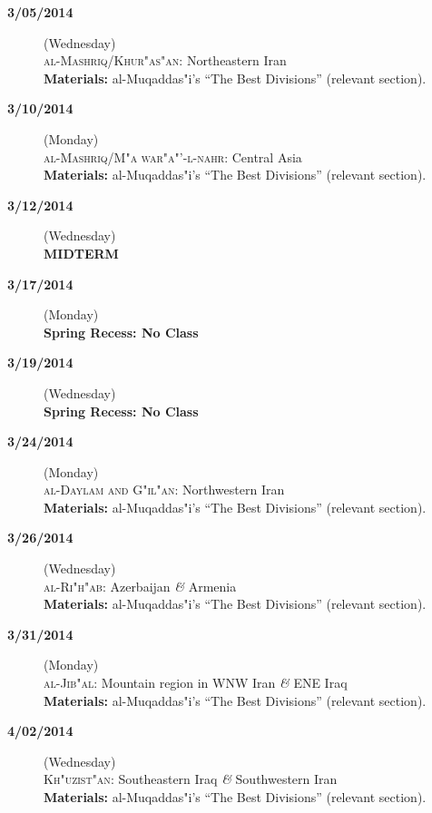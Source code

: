 \documentclass{tufte-handout} %
\def\and{\textit{\&}\xspace}
\begin{document}
\begin{description}
\item[\textbf{3/05/2014}] (Wednesday)\\
\textsc{al-Mashriq/Khur"as"an}: Northeastern Iran\\
\textbf{Materials:} al-Muqaddas"i's ``The Best Divisions'' (relevant section).

\noindent\hrulefill

\item[\textbf{3/10/2014}] (Monday)\\
\textsc{al-Mashriq/M"a war"a"'-l-nahr}: Central Asia\\
\textbf{Materials:} al-Muqaddas"i's ``The Best Divisions'' (relevant section).

\item[\textbf{3/12/2014}] (Wednesday)\\
\textbf{MIDTERM}

\noindent\hrulefill

\item[\textbf{3/17/2014}] (Monday)\\
\textbf{Spring Recess: No Class}

\item[\textbf{3/19/2014}] (Wednesday)\\
\textbf{Spring Recess: No Class}

\noindent\hrulefill

\item[\textbf{3/24/2014}] (Monday)\\
\textsc{al-Daylam and G"il"an}: Northwestern Iran\\
\textbf{Materials:} al-Muqaddas"i's ``The Best Divisions'' (relevant section).

\item[\textbf{3/26/2014}] (Wednesday)\\
\textsc{al-Ri"h"ab}: Azerbaijan \and  Armenia\\
\textbf{Materials:} al-Muqaddas"i's ``The Best Divisions'' (relevant section).

\noindent\hrulefill

\item[\textbf{3/31/2014}] (Monday)\\
\textsc{al-Jib"al}: Mountain region in WNW Iran \and  ENE Iraq\\
\textbf{Materials:} al-Muqaddas"i's ``The Best Divisions'' (relevant section).

\item[\textbf{4/02/2014}] (Wednesday)\\
\textsc{Kh"uzist"an}: Southeastern Iraq \and  Southwestern Iran\\
\textbf{Materials:} al-Muqaddas"i's ``The Best Divisions'' (relevant section).


\end{description}
\end{document}
